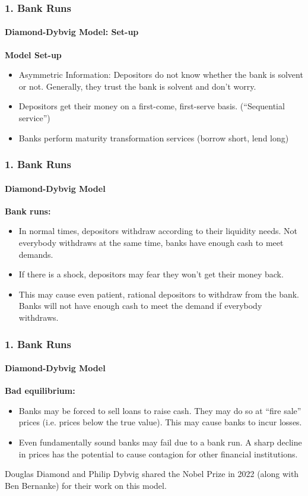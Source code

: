 \documentclass{beamer}
\begin{document}
\begin{frame}[t]
\frametitle{1. Bank Runs}
\framesubtitle{Diamond-Dybvig Model: Set-up}

    \textbf{Model Set-up}
    
    \begin{itemize}
        \item Asymmetric Information: Depositors do not know whether the bank is solvent or not.  Generally, they trust the bank is solvent and don’t worry.
        \item Depositors get their money on a first-come, first-serve basis.   (“Sequential service”)
        \item Banks perform maturity transformation services (borrow short, lend long)
    \end{itemize}

\end{frame}

\begin{frame}[t]
\frametitle{1. Bank Runs}
\framesubtitle{Diamond-Dybvig Model}

    \textbf{Bank runs:}
    
    \begin{itemize}
        \item In normal times, depositors withdraw according to their liquidity needs.   Not everybody withdraws at the same time, banks have enough cash to meet demands.
        \item If there is a shock, depositors may fear they won’t get their money back.
        \item This may cause even patient, rational depositors to withdraw from the bank.   Banks will not have enough cash to meet the demand if everybody withdraws.
    \end{itemize}

\end{frame}

\begin{frame}[t]
\frametitle{1. Bank Runs}
\framesubtitle{Diamond-Dybvig Model}

\textbf{Bad equilibrium:}

\begin{itemize}
    \item Banks may be forced to sell loans to raise cash.  They may do so at “fire sale” prices (i.e. prices below the true value).  This may cause banks to incur losses.
    \item Even fundamentally sound banks may fail due to a bank run. A sharp decline in prices has the potential to cause contagion for other financial institutions.
\end{itemize}

\vspace{1em}
Douglas Diamond and Philip Dybvig shared the Nobel Prize in 2022 (along with Ben Bernanke) for their work on this model.

\end{frame}
\end{document}
